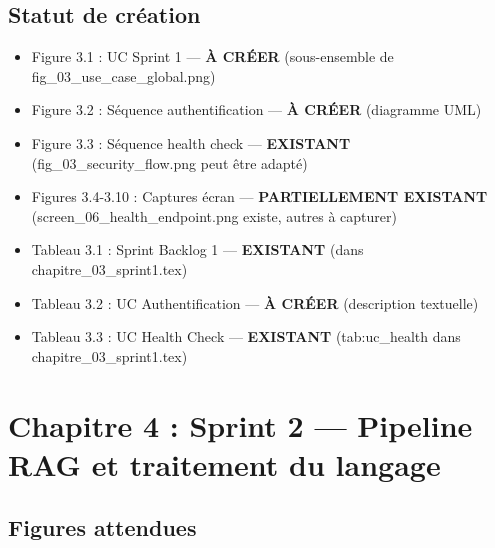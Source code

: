 \documentclass[12pt,a4paper]{article}
\begin{document}
\subsection*{Statut de création}

\begin{itemize}
    \item[\textcolor{green}{\checkmark}] Figure 3.1 : UC Sprint 1 — \textbf{À CRÉER} (sous-ensemble de fig\_03\_use\_case\_global.png)
    \item[\textcolor{green}{\checkmark}] Figure 3.2 : Séquence authentification — \textbf{À CRÉER} (diagramme UML)
    \item[\textcolor{green}{\checkmark}] Figure 3.3 : Séquence health check — \textbf{EXISTANT} (fig\_03\_security\_flow.png peut être adapté)
    \item[\textcolor{orange}{!}] Figures 3.4-3.10 : Captures écran — \textbf{PARTIELLEMENT EXISTANT} (screen\_06\_health\_endpoint.png existe, autres à capturer)
    
    \item[\textcolor{green}{\checkmark}] Tableau 3.1 : Sprint Backlog 1 — \textbf{EXISTANT} (dans chapitre\_03\_sprint1.tex)
    \item[\textcolor{green}{\checkmark}] Tableau 3.2 : UC Authentification — \textbf{À CRÉER} (description textuelle)
    \item[\textcolor{green}{\checkmark}] Tableau 3.3 : UC Health Check — \textbf{EXISTANT} (tab:uc\_health dans chapitre\_03\_sprint1.tex)
\end{itemize}


\section{Chapitre 4 : Sprint 2 — Pipeline RAG et traitement du langage}

\subsection*{Figures attendues}
\end{document}
